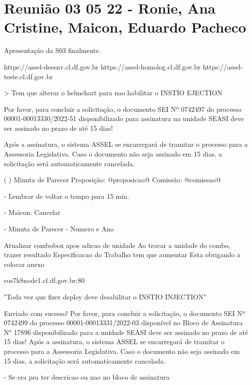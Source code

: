 \section{Reunião 03 05 22 - Ronie, Ana Cristine, Maicon, Eduardo Pacheco }

Apresentação da S03 finalmente.


https://assel-desenv.cl.df.gov.br
https://assel-homolog.cl.df.gov.br 
https://assel-teste.cl.df.gov.br


> Tem que alterar o helmchart para nao habilitar o INSTIO EJECTION


Por favor, para concluir a solicitação, o documento SEI Nº 0742497 do processo 00001-00013330/2022-51 disponibilizado para assinatura na unidade SEASI deve ser assinado no prazo de até 15 dias!

Após a assinatura, o sistema ASSEL se encarregará de tramitar o processo para a Assessoria Legislativa. Caso o documento não seja assinado em 15 dias, a solicitação será automaticamente cancelada.

( ) Minuta de Parecer
Proposição: @proposicao@
Comissão: @comissao@


- Lembrar de voltar o tempo para 15 min.

- Maicon: Cancelar

- Minuta de Parecer - Numero e Ano





Atualizar combobox apos adicao de unidade
Ao trocar a unidade do combo, trazer resultado
Especificacao do Trabalho tem que aumentar
Esta obrigando a colocar anexo 



cos7k8node1.cl.df.gov.br:80


"Toda vez que fizer deploy deve desabilitar o INSTIO INJECTION"


Enviado com sucesso!
Por favor, para concluir a solicitação, o documento SEI Nº 0742499 do processo 00001-00013331/2022-03 disponível no Bloco de Assinatura N° 17896 disponibilizado para a unidade SEASI deve ser assinado no prazo de até 15 dias!
Após a assinatura, o sistema ASSEL se encarregará de tramitar o processo para a Assessoria Legislativa. Caso o documento não seja assinado em 15 dias, a solicitação será automaticamente cancelada.

- Se era pra ter descricao ou nao no bloco de assinatura


